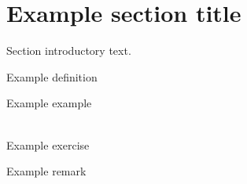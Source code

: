 \section{Example section title}\label{sec:secref}

Section introductory text.

\begin{definition}
    Example definition
\end{definition}

\begin{example}
    Example example
\end{example}

\begin{exercice}[\(\star\)]\,\\
    Example exercise
\end{exercice}

\begin{remark}
    Example remark
\end{remark}

